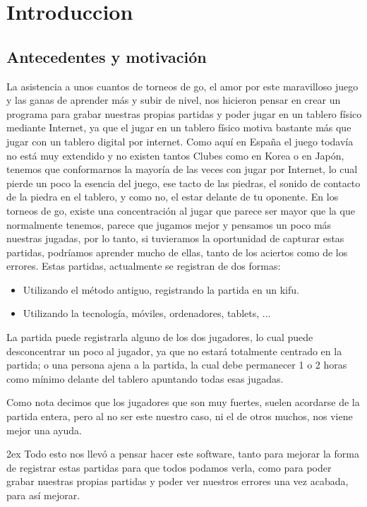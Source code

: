 \documentclass[12pt,a4paper]{report}
\begin{document}
\chapter{Introduccion}

\section{Antecedentes y motivación}

La asistencia a unos cuantos de torneos de go, el amor por este maravilloso
juego y las ganas de aprender más y subir de nivel, nos hicieron pensar en crear
un programa para grabar nuestras propias partidas y poder jugar en un tablero
físico mediante Internet, ya que el jugar en un tablero físico motiva bastante
más que jugar con un tablero digital por internet. Como aquí en España el juego todavía no está muy
extendido y no existen tantos Clubes como en Korea o en Japón, tenemos que
conformarnos la mayoría de las veces con jugar por Internet, lo cual pierde un
poco la esencia del juego, ese tacto de las piedras, el sonido de contacto de la
piedra en el tablero, y como no, el estar delante de tu oponente. 
En los torneos de go, existe una concentración al jugar que parece ser mayor que
la que normalmente tenemos, parece que jugamos mejor y pensamos un poco más nuestras
jugadas, por lo tanto, si tuvieramos la oportunidad de capturar estas partidas,
podríamos aprender mucho de ellas, tanto de los aciertos como de los errores. 
Estas partidas, actualmente se registran de dos formas: 
\begin{itemize}
    \item Utilizando el método antiguo, registrando la partida en un kifu. 
    \item Utilizando la tecnología, móviles, ordenadores, tablets, ...
\end{itemize} 

La partida puede registrarla alguno de los dos jugadores, lo cual puede
desconcentrar un poco al jugador, ya que no estará totalmente centrado en la
partida; o una persona ajena a la partida, la cual debe permanecer 1 o 2 horas
como mínimo delante del tablero apuntando todas esas jugadas. 

Como nota decimos que los jugadores que son muy fuertes, suelen acordarse de la
partida entera, pero al no ser este nuestro caso, ni el de otros muchos, nos
viene mejor una ayuda. 

\parskip 2ex
Todo esto nos llevó a pensar hacer este software, tanto para mejorar la forma de
registrar estas partidas para que todos podamos verla, como para poder grabar
nuestras propias partidas y poder ver nuestros errores una vez acabada, para así
mejorar. 
\end{document}
